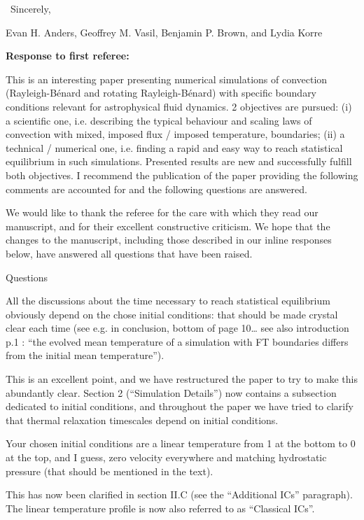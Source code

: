 \documentclass[aps, 11pt, singlecolumn]{revtex4-1} %
\begin{document}
\begin{singlespace}
$\,$\newline
\noindent
Sincerely,

Evan H. Anders, Geoffrey M. Vasil, Benjamin P. Brown, and Lydia Korre



\newpage
\noindent
\Large{\textbf{Response to first referee:}}\newline$\,$\newline\indent

\begin{myquotation}
This is an interesting paper presenting numerical simulations of convection (Rayleigh-B\'{e}nard and rotating Rayleigh-B\'{e}nard) with specific boundary conditions relevant for astrophysical fluid dynamics. 
2 objectives are pursued: (i) a scientific one, i.e. describing the typical behaviour and scaling laws of convection with mixed, imposed flux / imposed temperature, boundaries; (ii) a technical / numerical one, i.e. finding a rapid and easy way to reach statistical equilibrium in such simulations. 
Presented results are new and successfully fulfill both objectives. 
I recommend the publication of the paper providing the following comments are accounted for and the following questions are answered.
\end{myquotation}

We would like to thank the referee for the care with which they read our manuscript, and for their excellent constructive criticism.
We hope that the changes to the manuscript, including those described in our inline responses below, have answered all questions that have been raised.


\begin{myquotation}
Questions

All the discussions about the time necessary to reach statistical equilibrium obviously depend on the chose initial conditions: that should be made crystal clear each time (see e.g. in conclusion, bottom of page 10… see also introduction p.1 : ``the evolved mean temperature of a simulation with FT boundaries differs from the initial mean temperature'').
\end{myquotation}
This is an excellent point, and we have restructured the paper to try to make this abundantly clear.
Section 2 (``Simulation Details'') now contains a subsection dedicated to initial conditions, and throughout the paper we have tried to clarify that thermal relaxation timescales depend on initial conditions.

\begin{myquotation}
Your chosen initial conditions are a linear temperature from 1 at the bottom to 0 at the top, and I guess, zero velocity everywhere and matching hydrostatic pressure (that should be mentioned in the text). 
\end{myquotation}
This has now been clarified in section II.C (see the ``Additional ICs'' paragraph).
The linear temperature profile is now also referred to as ``Classical ICs''.


\end{singlespace}
\end{document}
